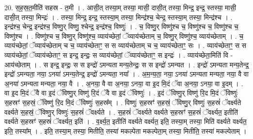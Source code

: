 \documentclass[17pt]{extarticle}
\begin{document}
20. स॒ह॒स्र॒त॒मीति॑ सहस्र - त॒मी । . आसी॒त् तस्या॒म् तस्या॒ मासी॒ दासी॒त् तस्या॒ मिन्द्र॒ इन्द्र॒ स्तस्या॒ मासी॒ दासी॒त् तस्या॒ मिन्द्रः॑ । . तस्या॒ मिन्द्र॒ इन्द्र॒ स्तस्या॒म् तस्या॒ मिन्द्र॑श्च॒ चेन्द्र॒ स्तस्या॒म् तस्या॒ मिन्द्र॑श्च । . इन्द्र॑श्च॒ चेन्द्र॒ इन्द्र॑श्च॒ विष्णु॒र् विष्णु॒ श्चेन्द्र॒ इन्द्र॑श्च॒ विष्णुः॑ । . च॒ विष्णु॒र् विष्णु॑श्च च॒ विष्णु॑श्च च॒ विष्णु॑श्च च॒ विष्णु॑श्च । . विष्णु॑श्च च॒ विष्णु॒र् विष्णु॑श्च॒ व्याय॑च्छेतां॒ ॅव्याय॑च्छेताम् च॒ विष्णु॒र् विष्णु॑श्च॒ व्याय॑च्छेताम् । . च॒ व्याय॑च्छेतां॒ ॅव्याय॑च्छेताम् च च॒ व्याय॑च्छेताꣳ॒॒ स स व्याय॑च्छेताम् च च॒ व्याय॑च्छेताꣳ॒॒ सः । . व्याय॑च्छेताꣳ॒॒ स स व्याय॑च्छेतां॒ ॅव्याय॑च्छेताꣳ॒॒ स इन्द्र॒ इन्द्रः॒ स व्याय॑च्छेतां॒ ॅव्याय॑च्छेताꣳ॒॒ स इन्द्रः॑ । . व्याय॑च्छेता॒मिति॑ वि - आय॑च्छेताम् । . स इन्द्र॒ इन्द्रः॒ स स इन्द्रो॑ ऽमन्यता मन्य॒तेन्द्रः॒ स स इन्द्रो॑ ऽमन्यत । . इन्द्रो॑ ऽमन्यता मन्य॒तेन्द्र॒ इन्द्रो॑ ऽमन्यता॒ नया॒ ऽनया॑ ऽमन्य॒तेन्द्र॒ इन्द्रो॑ ऽमन्यता॒ नया᳚ । . अ॒म॒न्य॒ता॒ नया॒ ऽनया॑ ऽमन्यता मन्यता॒ नया॒ वै वा अ॒नया॑ ऽमन्यता मन्यता॒ नया॒ वै । . अ॒नया॒ वै वा अ॒नया॒ ऽनया॒ वा इ॒द मि॒दं ॅवा अ॒नया॒ ऽनया॒ वा इ॒दम् । . वा इ॒द मि॒दं ॅवै वा इ॒दं ॅविष्णु॒र् विष्णु॑ रि॒दं ॅवै वा इ॒दं ॅविष्णुः॑ । . इ॒दं ॅविष्णु॒र् विष्णु॑ रि॒द मि॒दं ॅविष्णुः॑ स॒हस्रꣳ॑ स॒हस्रं॒ ॅविष्णु॑ रि॒द मि॒दं ॅविष्णुः॑ स॒हस्र᳚म् । . विष्णुः॑ स॒हस्रꣳ॑ स॒हस्रं॒ ॅविष्णु॒र् विष्णुः॑ स॒हस्रं॑ ॅवर्क्ष्यते वर्क्ष्यते स॒हस्रं॒ ॅविष्णु॒र् विष्णुः॑ स॒हस्रं॑ ॅवर्क्ष्यते । . स॒हस्रं॑ ॅवर्क्ष्यते वर्क्ष्यते स॒हस्रꣳ॑ स॒हस्रं॑ ॅवर्क्ष्यत॒ इतीति॑ वर्क्ष्यते स॒हस्रꣳ॑ स॒हस्रं॑ ॅवर्क्ष्यत॒ इति॑ । . व॒र्क्ष्य॒त॒ इतीति॑ वर्क्ष्यते वर्क्ष्यत॒ इति॒ तस्या॒म् तस्या॒ मिति॑ वर्क्ष्यते वर्क्ष्यत॒ इति॒ तस्या᳚म् । . इति॒ तस्या॒म् तस्या॒ मितीति॒ तस्या॑ मकल्पेता मकल्पेता॒म् तस्या॒ मितीति॒ तस्या॑ मकल्पेताम् । \newline
\end{document}
